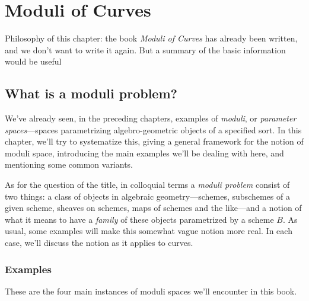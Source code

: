 

\chapter{Moduli of Curves} 
\label{Moduli chapter}

Philosophy of this chapter: the book \emph{Moduli of Curves} has already been written, and we don't want to write it again. But a summary of the basic information would be useful

\section{What is a moduli problem?}

We've already seen, in the preceding chapters, examples of \emph{moduli}, or \emph{parameter spaces}---spaces parametrizing algebro-geometric objects of a specified sort. In this chapter, we'll try to systematize this, giving a general framework for the notion of moduli space, introducing the main examples we'll be dealing with here, and mentioning some common variants.

As for the question of the title, in colloquial terms a \emph{moduli problem} consist of two things: a class of objects in algebraic geometry---schemes, subschemes of a given scheme, sheaves on schemes, maps of schemes and the like---and a notion of what it means to have a \emph{family} of these objects parametrized by a scheme $B$. As usual, some examples will make this somewhat vague notion more real. In each case, we'll discuss the notion as it applies to curves.

\subsection{Examples}

These are the four main instances of moduli spaces we'll encounter in this book.

